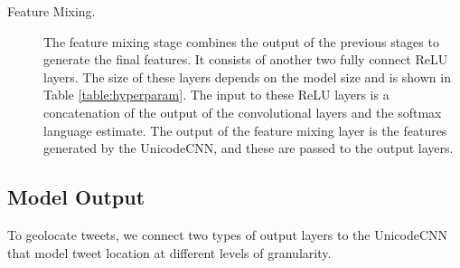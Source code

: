 \documentclass[sigconf,anonymous,review]{acmart}
\begin{document}
\begin{description}

\item[Feature Mixing.]
The feature mixing stage combines the output of the previous stages to generate the final features.
It consists of another two fully connect ReLU layers.
The size of these layers depends on the model size and is shown in Table \ref{table:hyperparam}.
The input to these ReLU layers is a concatenation of the output of the convolutional layers and the softmax language estimate.
The output of the feature mixing layer is the features generated by the UnicodeCNN,
and these are passed to the output layers.


\end{description}


\subsection{Model Output}
\label{sec:outputs}

To geolocate tweets, we connect two types of output layers to the UnicodeCNN that model tweet location at different levels of granularity.
\end{document}
